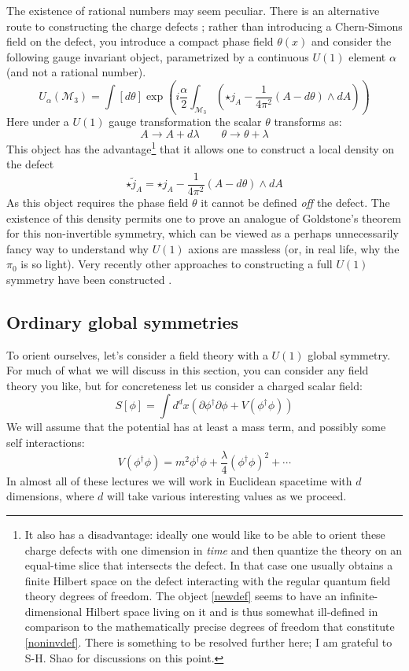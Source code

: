 \documentclass[aps,preprint,nofootinbib,preprintnumbers,eqsecnum,superscriptaddress]{revtex4}
\newcommand{\be}{\begin{equation}}
\newcommand{\ee}{\end{equation}}
\def\le{\left}
\def\ri{\right}
\def\al{{\alpha}}
\def\th{{\theta}}
\newcommand{\p}{\partial}
\newcommand\sM{{\ensuremath{{\mathcal M}}}}
\def\th{{\theta}}
\numberwithin{equation}{section}
\begin{document}
The existence of rational numbers may seem peculiar. There is an alternative route to constructing the charge defects \cite{GarciaEtxebarria:2022jky,Karasik:2022kkq}; rather than introducing a Chern-Simons field on the defect, you introduce a compact phase field $\th(x)$ and consider the following gauge invariant object, parametrized by a continuous $U(1)$ element $\al$ (and not a rational number).  
\be
U_{\al}(\sM_3) = \int [d\th] \exp\le(i\frac{\al}{2} \int_{\sM_3} \le(\star j_{A} - \frac{1}{4\pi^2} (A - d\theta) \wedge dA\ri)\ri) \label{newdef} 
\ee
Here under a $U(1)$ gauge transformation the scalar $\theta$ transforms as:
\be
A \to A + d\lambda \qquad \theta \to \theta + \lambda
\ee
This object has the advantage\footnote{It also has a disadvantage: ideally one would like to be able to orient these charge defects with one dimension in {\it time} and then quantize the theory on an equal-time slice that intersects the defect. In that case one usually obtains a finite Hilbert space on the defect interacting with the regular quantum field theory degrees of freedom. The object \eqref{newdef} seems to have an infinite-dimensional Hilbert space living on it and is thus somewhat ill-defined in comparison to the mathematically precise degrees of freedom that constitute \eqref{noninvdef}. There is something to be resolved further here; I am grateful to S-H. Shao for discussions on this point.}   that it allows one to construct a local density on the defect
\be
\star \tilde{j}_A =  \star j_{A} - \frac{1}{4\pi^2} (A - d\theta) \wedge dA
\ee
As this object requires the phase field $\theta$ it cannot be defined {\it off} the defect. The existence of this density permits one to prove an analogue of Goldstone's theorem for this non-invertible symmetry, which can be viewed as a perhaps unnecessarily fancy way to understand why $U(1)$ axions are massless (or, in real life, why the $\pi_0$ is so light). Very recently other approaches to constructing a full $U(1)$ symmetry have been constructed \cite{Arbalestrier:2024oqg}. 


\subsection{Ordinary global symmetries}

To orient ourselves, let's consider a field theory with a $U(1)$ global symmetry. For much of what we will discuss in this section, you can consider any field theory you like, but for concreteness let us consider a charged scalar field:
\be
S[\phi] = \int d^{d}x \le(\p \phi^{\dagger} \p \phi + V(\phi^{\dagger}\phi)\ri)  \label{compscalac} 
\ee
We will assume that the potential has at least a mass term, and possibly some self interactions:
\be
V(\phi^{\dagger}\phi) = m^2 \phi^{\dagger} \phi + \frac{\lambda}{4}(\phi^{\dagger}\phi)^2 + \cdots \label{pot}
\ee
In almost all of these lectures we will work in Euclidean spacetime with $d$ dimensions, where $d$ will take various interesting values as we proceed. 
\end{document}
